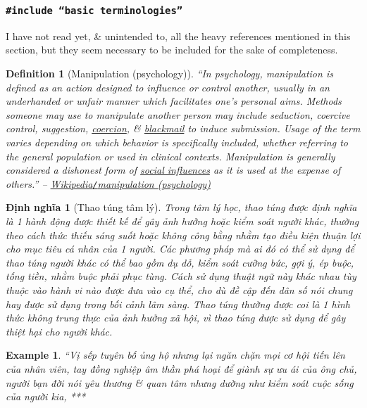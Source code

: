 \documentclass[12pt]{article}
\newtheorem{definition}{Definition}[section]
\newtheorem{dinhnghia}{Định nghĩa}[section]
\newtheorem{example}{Example}
\begin{document}

\subsubsection{{\tt {\color{RubineRed}\#include} ``basic terminologies''}}
I have not read yet, \& unintended to, all the heavy references mentioned in this section, but they seem necessary to be included for the sake of completeness.

\begin{definition}[Manipulation (psychology)]
	``In psychology, \emph{manipulation} is defined as an action designed to influence or control another, usually in an underhanded or unfair manner which facilitates one's personal aims. Methods someone may use to manipulate another person may include seduction, coercive control, suggestion, \href{https://en.wikipedia.org/wiki/Coercion}{coercion}, \& \href{https://en.wikipedia.org/wiki/Blackmail}{blackmail} to induce submission. Usage of the term varies depending on which behavior is specifically included, whether referring to the general population or used in clinical contexts. Manipulation is generally considered a dishonest form of \href{https://en.wikipedia.org/wiki/Social_influence}{social influences} as it is used at the expense of others.'' -- \href{https://en.wikipedia.org/wiki/Manipulation_(psychology)}{Wikipedia{\tt/}manipulation (psychology)}
\end{definition}

\begin{dinhnghia}[Thao túng tâm lý]
	Trong tâm lý học, \emph{thao túng} được định nghĩa là 1 hành động được thiết kế để gây ảnh hưởng hoặc kiểm soát người khác, thường theo cách thức thiếu sáng suốt hoặc không công bằng nhằm tạo điều kiện thuận lợi cho mục tiêu cá nhân của 1 người. Các phương pháp mà ai đó có thể sử dụng để thao túng người khác có thể bao gồm dụ dỗ, kiểm soát cưỡng bức, gợi ý, ép buộc, tống tiền, nhằm buộc phải phục tùng. Cách sử dụng thuật ngữ này khác nhau tùy thuộc vào hành vi nào được đưa vào cụ thể, cho dù đề cập đến dân số nói chung hay được sử dụng trong bối cảnh lâm sàng. Thao túng thường được coi là 1 hình thức không trung thực của ảnh hưởng xã hội, vì thao túng được sử dụng để gây thiệt hại cho người khác.
\end{dinhnghia}

\begin{example}
	``Vị sếp tuyên bố ủng hộ nhưng lại ngăn chặn mọi cơ hội tiến lên của nhân viên, tay đồng nghiệp âm thần phá hoại để giành sự ưu ái của ông chủ, người bạn đời nói yêu thương \& quan tâm nhưng dường như kiểm soát cuộc sống của người kia, ***
\end{example}
\end{document}
